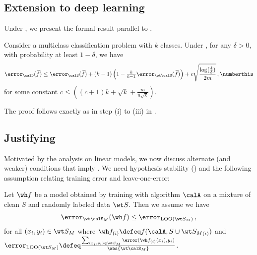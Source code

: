 \subsection{Extension to deep learning} \label{appsubsec:ext_DL}
Under , we present the formal result parallel to . 
\begin{theorem} \label{thm:multiclass_ERM_algoA}
    Consider a multiclass classification problem 
    with $k$ classes. Under , 
    for any $\delta >0$, with probability at least $1-\delta$,
    we have
    \vspace{-10pt}
    \begin{align*}
        \error_\calD(\widehat f)  \le \error_\calS(\widehat f) + (k-1) \left(1 - \tfrac{k}{k-1} \error_{\wt\calS}(\widehat f)\right) + c\sqrt{\frac{\log(\frac{4}{\delta})}{2m}} \,,\numberthis \label{eq:multiclass_ERM_deep}
    \end{align*}
    for some constant $c \le ((c+1) k+\sqrt{k} + \frac{m}{n\sqrt{k}})$.
\end{theorem}

The proof follows exactly as in step (i) to (iii) in .  

\subsection{Justifying~} \label{appsubsec:justifying_assumption1}

Motivated by the analysis on linear models, we now discuss alternate (and weaker) conditions that imply . 
We need hypothesis stability () and the following assumption relating training error and leave-one-error: 

\begin{assumption} \label{asmp:loo_error}
Let $\wh f$ be a model obtained by training with algorithm $\calA$ on a mixture of clean $S$ and randomly labeled data $\wt S$. Then we assume we have 
\begin{align*}
    \error_{\wt \calS_M} (\wh f) \le  \error_{\text{LOO} (\wt S_M)} \,, 
\end{align*}
for all $(x_i, y_i) \in  \wt S_M$ where $\wh f_{(i)} \defeq f(\calA, S \cup {{}\wt S_M}_{(i)})$ and  $\error_{\text{LOO} (\wt S_M)} \defeq  \frac{\sum_{(x_i, y_i) \in \wt S_M} \error(\ff{i}(x_i), y_i ) }{\abs{\wt \calS_M}}$.  
\end{assumption}

